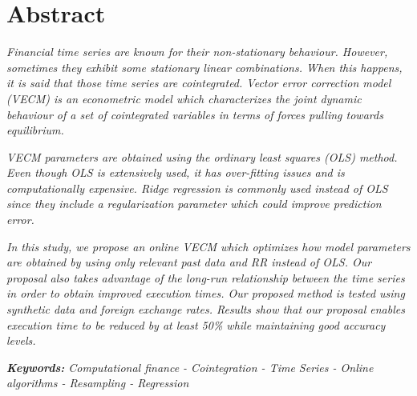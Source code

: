 \chapter*{Abstract}

\emph{Financial time series are known for their non-stationary behaviour. However,
sometimes they exhibit some stationary linear combinations. When this happens,
it is said that those time series are cointegrated. Vector error correction
model (VECM) is an econometric model which characterizes the joint dynamic
behaviour of a set of cointegrated variables in terms of forces pulling towards
equilibrium.}

\emph{VECM parameters are obtained using the ordinary least squares (OLS)
method.  Even though OLS is extensively used, it has over-fitting
issues and is computationally expensive. Ridge regression is commonly used
instead of OLS since they include a regularization parameter which could improve
prediction error.}

\emph{In this study, we propose an online VECM which optimizes how model parameters
are obtained by using only relevant past data and RR instead of OLS.  Our
proposal also takes advantage of the long-run relationship between the time
series in order to obtain improved execution times. Our proposed method is
tested using synthetic data and foreign exchange rates.
Results show that our proposal enables execution time to be reduced by at least
50\% while maintaining good accuracy levels.}

\vspace{0.8cm}

\emph{\textbf{Keywords:} Computational finance  - Cointegration  - Time Series - 
Online algorithms - Resampling  - Regression}


